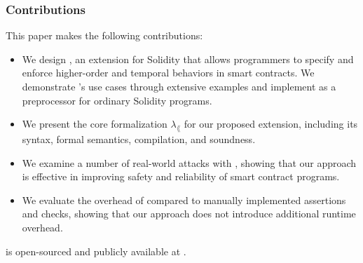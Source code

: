 \subsubsection*{\textbf{Contributions}} This paper makes the following contributions:
\begin{itemize}
  \item We design \lang, an extension for Solidity that allows programmers to
        specify and enforce higher-order and temporal behaviors in smart contracts.
        We demonstrate \lang's use cases through extensive examples and
        implement \lang as a preprocessor for ordinary Solidity programs.
	\item We present the core formalization $\lambda_\lang$ for our proposed
	      extension, including its syntax, formal semantics, compilation, and
	      soundness.
  \item We examine a number of real-world attacks with \lang, showing that our
        approach is effective in improving safety and reliability of smart contract
        programs.
  \item We evaluate the overhead of \lang compared to manually implemented
        assertions and checks, showing that our approach does not introduce
        additional runtime overhead.
\end{itemize}

\lang is open-sourced and publicly available at .

